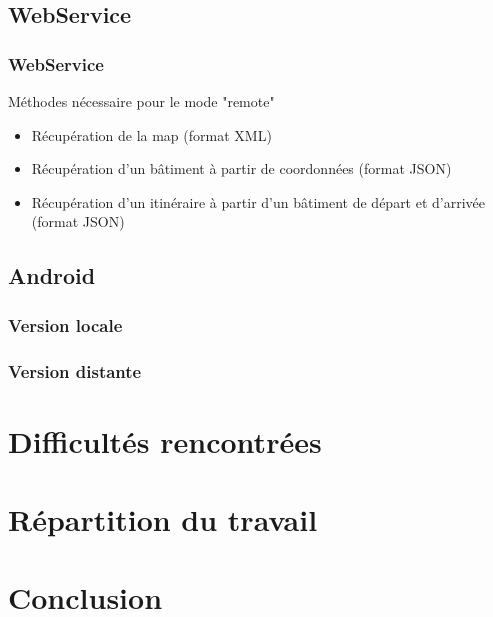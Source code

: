 \documentclass{beamer}
\begin{document}
\subsection{WebService}
\begin{frame}
\frametitle{WebService}
\begin{block}{Méthodes nécessaire pour le mode "remote"}
\begin{itemize}
\item Récupération de la map (format XML)
\item Récupération d'un bâtiment à partir de coordonnées (format JSON)
\item Récupération d'un itinéraire à partir d'un bâtiment de départ et d'arrivée (format JSON)
\end{itemize}
\end{block}
\end{frame}

\subsection{Android}
\subsubsection{Version locale}
\begin{frame}
\end{frame}
\subsubsection{Version distante}
\begin{frame}
\end{frame}


\section{Difficultés rencontrées}
\begin{frame}
\end{frame}


\section{Répartition du travail}
\begin{frame}
\end{frame}


\section{Conclusion}
\begin{frame}
\end{frame}
\end{document}

